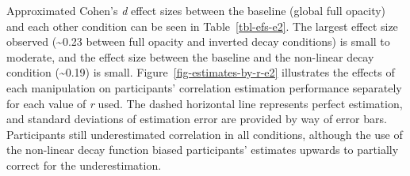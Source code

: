 \documentclass[../main.tex]{subfiles}
\begin{document}
\begin{table}

\caption{\label{tbl-efs-e2}Cohen's \textit{d} effect sizes (a) and
summary statistics (b) for the opacity decay function condition in
Experiment 2. Each effect size is compared to the reference level, full
opacity (alpha = 1).}

\begin{minipage}{0.50\linewidth}



\end{minipage}%
%
\begin{minipage}{0.50\linewidth}



\end{minipage}%

\end{table}%

Approximated Cohen's \emph{d} effect sizes between the baseline (global
full opacity) and each other condition can be seen in
Table~\ref{tbl-efs-e2}. The largest effect size observed (\sim 0.23
between full opacity and inverted decay conditions) is small to
moderate, and the effect size between the baseline and the non-linear
decay condition (\sim 0.19) is small. Figure~\ref{fig-estimates-by-r-e2}
illustrates the effects of each manipulation on participants'
correlation estimation performance separately for each value of \emph{r}
used. The dashed horizontal line represents perfect estimation, and
standard deviations of estimation error are provided by way of error
bars. Participants still underestimated correlation in all conditions,
although the use of the non-linear decay function biased participants'
estimates upwards to partially correct for the underestimation.
\end{document}
